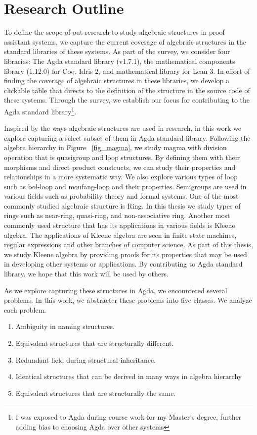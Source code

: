 \section{Research Outline}
To define the scope of out research to study algebraic structures in proof
assistant systems, we capture the current coverage of algebraic structures in
the standard libraries of these systems. As part of the survey, we consider four
libraries: The Agda standard library (v1.7.1), the mathematical components
library (1.12.0) for Coq, Idris 2, and mathematical library for Lean 3. In
effort of finding the coverage of algebraic structures in these libraries, we
develop a clickable table that directs to the definition of the structure in the
source code of these systems. Through the survey, we establish our focus for
contributing to the Agda standard library\footnote{I was exposed to Agda during
course work for my Master's degree, further adding bias to choosing Agda over
other systems}.

Inspired by the ways algebraic structures are used in research, in this work we
explore capturing a select subset of them in Agda standard library. Following
the algebra hierarchy in Figure ~\ref{fig_magma}, we study magma with division
operation that is quasigroup and loop structures. By defining them with their
morphisms and direct product constructs, we can study their properties and
relationships in a more systematic way. We also explore various types of loop
such as bol-loop and moufang-loop and their properties. Semigroups are used in
various fields such as probability theory and formal systems. One of the most
commonly studied algebraic structure is Ring. In this thesis we study types of
rings such as near-ring, quasi-ring, and non-associative ring. Another most
commonly used structure that has its applications in various fields is Kleene
algebra. The applications of Kleene algebra are seen in finite state machines,
regular expressions and other branches of computer science. As part of this
thesis, we study Kleene algebra by providing proofs for its properties that may
be used in developing other systems or applications. By contributing to Agda
standard library, we hope that this work will be used by others. 

As we explore capturing these structures in Agda, we encountered several
problems. In this work, we abstracter these problems into five classes. We
analyze each problem. 
\begin{enumerate}
\item Ambiguity in naming structures.
\item Equivalent structures that are structurally different.
\item Redundant field during structural inheritance.
\item Identical structures that can be derived in many ways in algebra hierarchy
\item Equivalent structures that are structurally the same.
\end{enumerate}

